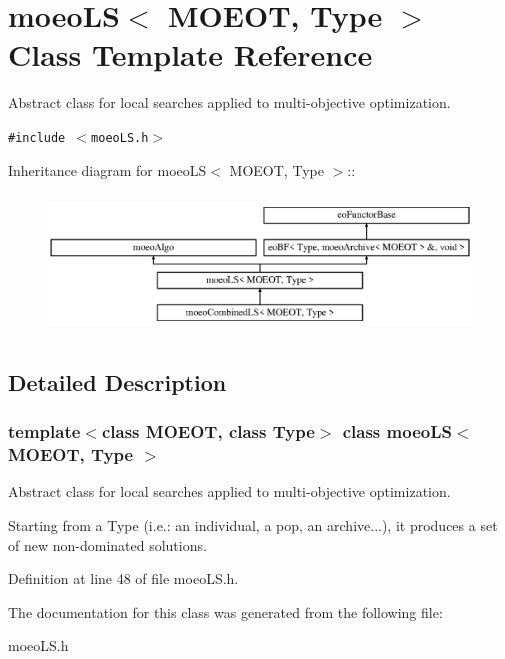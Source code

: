 \section{moeo\-LS$<$ MOEOT, Type $>$ Class Template Reference}
\label{classmoeoLS}
Abstract class for local searches applied to multi-objective optimization.  


{\tt \#include $<$moeo\-LS.h$>$}

Inheritance diagram for moeo\-LS$<$ MOEOT, Type $>$::\begin{figure}[H]
\begin{center}
\leavevmode
\includegraphics[height=3.69637cm]{classmoeoLS}
\end{center}
\end{figure}


\subsection{Detailed Description}
\subsubsection*{template$<$class MOEOT, class Type$>$ class moeo\-LS$<$ MOEOT, Type $>$}

Abstract class for local searches applied to multi-objective optimization. 

Starting from a Type (i.e.: an individual, a pop, an archive...), it produces a set of new non-dominated solutions. 



Definition at line 48 of file moeo\-LS.h.

The documentation for this class was generated from the following file:\begin{CompactItemize}
\item 
moeo\-LS.h\end{CompactItemize}
